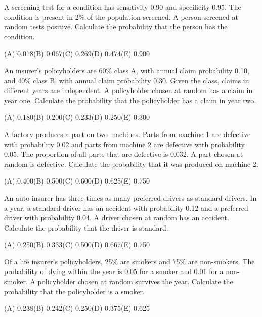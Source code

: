 \begin{practice}
A screening test for a condition has sensitivity 0.90 and specificity 0.95. The condition
is present in 2\% of the population screened. A person screened at random tests positive.
Calculate the probability that the person has the condition.
\par\smallskip\noindent (A) 0.018\qquad (B) 0.067\qquad (C) 0.269\qquad (D) 0.474\qquad (E) 0.900
\end{practice}

\begin{practice}
An insurer's policyholders are 60\% class A, with annual claim probability 0.10, and 40\%
class B, with annual claim probability 0.30. Given the class, claims in different years are
independent. A policyholder chosen at random has a claim in year one. Calculate the
probability that the policyholder has a claim in year two.
\par\smallskip\noindent (A) 0.180\qquad (B) 0.200\qquad (C) 0.233\qquad (D) 0.250\qquad (E) 0.300
\end{practice}

\begin{practice}
A factory produces a part on two machines. Parts from machine 1 are defective with
probability 0.02 and parts from machine 2 are defective with probability 0.05. The
proportion of all parts that are defective is 0.032. A part chosen at random is defective.
Calculate the probability that it was produced on machine 2.
\par\smallskip\noindent (A) 0.400\qquad (B) 0.500\qquad (C) 0.600\qquad (D) 0.625\qquad (E) 0.750
\end{practice}

\begin{practice}
An auto insurer has three times as many preferred drivers as standard drivers. In a year,
a standard driver has an accident with probability 0.12 and a preferred driver with
probability 0.04. A driver chosen at random has an accident. Calculate the probability that
the driver is standard.
\par\smallskip\noindent (A) 0.250\qquad (B) 0.333\qquad (C) 0.500\qquad (D) 0.667\qquad (E) 0.750
\end{practice}

\begin{practice}
Of a life insurer's policyholders, 25\% are smokers and 75\% are non-smokers. The
probability of dying within the year is 0.05 for a smoker and 0.01 for a non-smoker. A
policyholder chosen at random survives the year. Calculate the probability that the
policyholder is a smoker.
\par\smallskip\noindent (A) 0.238\qquad (B) 0.242\qquad (C) 0.250\qquad (D) 0.375\qquad (E) 0.625
\end{practice}


